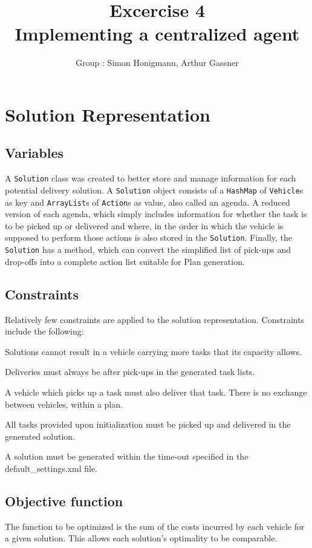 \documentclass[11pt]{article}
\title{\bf Excercise 4\\ Implementing a centralized agent}
\author{Group \textnumero76: Simon Honigmann, Arthur Gassner}
\begin{document}
\maketitle
\section{Solution Representation}
\subsection{Variables}
A \texttt{Solution} class was created to better store and manage information for each potential delivery solution. A \texttt{Solution} object consists of a \texttt{HashMap} of \texttt{Vehicle}s as key and \texttt{ArrayList}s of \texttt{Action}s as value, also called an agenda. A reduced version of each agenda, which simply includes information for whether the task is to be picked up or delivered and where, in the order in which the vehicle is supposed to perform those actions is also stored in the \texttt{Solution}. Finally, the \texttt{Solution} has a method, which can convert the simplified list of pick-ups and drop-offs into a complete action list suitable for Plan generation.

\subsection{Constraints}
Relatively few constraints are applied to the solution representation. Constraints include the following:

\begin{compactenum}
	\item Solutions cannot result in a vehicle carrying more tasks that its capacity allows.
	\item Deliveries must always be after pick-ups in the generated task lists.
	\item A vehicle which picks up a task must also deliver that task. There is no exchange between vehicles, within a plan.
	\item All tasks provided upon initialization must be picked up and delivered in the generated solution.
	\item A solution must be generated within the time-out specified in the default\_settings.xml file. 
\end{compactenum}

\subsection{Objective function}
The function to be optimized is the sum of the costs incurred by each vehicle for a given solution. This allows each solution's optimality to be comparable.
\end{document}
